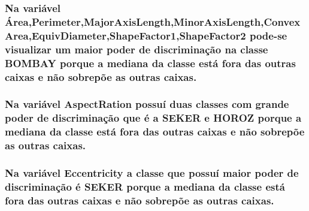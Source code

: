 \documentclass[
]{article}
\begin{document}
\hypertarget{na-variuxe1vel-uxe1reaperimetermajoraxislengthminoraxislengthconvexareaequivdiametershapefactor1shapefactor2-pode-se-visualizar-um-maior-poder-de-discriminauxe7uxe3o-na-classe-bombay-porque-a-mediana-da-classe-estuxe1-fora-das-outras-caixas-e-nuxe3o-sobrepuxf5e-as-outras-caixas.}{%
\subsubsection{Na variável
Área,Perimeter,MajorAxisLength,MinorAxisLength,ConvexArea,EquivDiameter,ShapeFactor1,ShapeFactor2
pode-se visualizar um maior poder de discriminação na classe BOMBAY
porque a mediana da classe está fora das outras caixas e não sobrepõe as
outras
caixas.}\label{na-variuxe1vel-uxe1reaperimetermajoraxislengthminoraxislengthconvexareaequivdiametershapefactor1shapefactor2-pode-se-visualizar-um-maior-poder-de-discriminauxe7uxe3o-na-classe-bombay-porque-a-mediana-da-classe-estuxe1-fora-das-outras-caixas-e-nuxe3o-sobrepuxf5e-as-outras-caixas.}}

\hypertarget{na-variuxe1vel-aspectration-possuuxed-duas-classes-com-grande-poder-de-discriminauxe7uxe3o-que-uxe9-a-seker-e-horoz-porque-a-mediana-da-classe-estuxe1-fora-das-outras-caixas-e-nuxe3o-sobrepuxf5e-as-outras-caixas.}{%
\subsubsection{Na variável AspectRation possuí duas classes com grande
poder de discriminação que é a SEKER e HOROZ porque a mediana da classe
está fora das outras caixas e não sobrepõe as outras
caixas.}\label{na-variuxe1vel-aspectration-possuuxed-duas-classes-com-grande-poder-de-discriminauxe7uxe3o-que-uxe9-a-seker-e-horoz-porque-a-mediana-da-classe-estuxe1-fora-das-outras-caixas-e-nuxe3o-sobrepuxf5e-as-outras-caixas.}}

\hypertarget{na-variuxe1vel-eccentricity-a-classe-que-possuuxed-maior-poder-de-discriminauxe7uxe3o-uxe9-seker-porque-a-mediana-da-classe-estuxe1-fora-das-outras-caixas-e-nuxe3o-sobrepuxf5e-as-outras-caixas.}{%
\subsubsection{Na variável Eccentricity a classe que possuí maior poder
de discriminação é SEKER porque a mediana da classe está fora das outras
caixas e não sobrepõe as outras
caixas.}\label{na-variuxe1vel-eccentricity-a-classe-que-possuuxed-maior-poder-de-discriminauxe7uxe3o-uxe9-seker-porque-a-mediana-da-classe-estuxe1-fora-das-outras-caixas-e-nuxe3o-sobrepuxf5e-as-outras-caixas.}}
\end{document}
